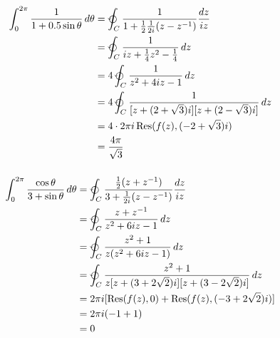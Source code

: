 \documentclass{article}
\newcommand{\Res}{\operatorname{Res}}
\begin{document}
\begin{align*}
  \int_0^{2 \pi} \frac{1}{1 + 0.5 \sin \theta} \,d \theta & = \varointctrclockwise_C \frac{1}{1 + \frac{1}{2} \frac{1}{2 i} (z - z^{-1})} \frac{d z}{i z} \\
                                                          & = \varointctrclockwise_C \frac{1}{i z + \frac{1}{4} z^2 - \frac{1}{4}} \,d z                  \\
                                                          & = 4 \varointctrclockwise_C \frac{1}{z^2 + 4 i z - 1} \,d z                                    \\
                                                          & = 4 \varointctrclockwise_C \frac{1}{[z + (2 + \sqrt{3}) i] [z + (2 - \sqrt{3}) i]} \,d z      \\
                                                          & = 4 \cdot 2 \pi i \Res(f(z), (-2 + \sqrt{3}) i)                                               \\
                                                          & = \frac{4 \pi}{\sqrt{3}}
\end{align*}

\setcounter{subsubsection}{2}
\subsubsection{}

\begin{align*}
  \int_0^{2 \pi} \frac{\cos \theta}{3 + \sin \theta} \,d \theta & = \varointctrclockwise_C \frac{\frac{1}{2} (z + z^{-1})}{3 + \frac{1}{2 i} (z - z^{-1})} \frac{d z}{i z} \\
                                                                & = \varointctrclockwise_C \frac{z + z^{-1}}{z^2 + 6 i z - 1} \,d z                                        \\
                                                                & = \varointctrclockwise_C \frac{z^2 + 1}{z (z^2 + 6 i z - 1)} \,d z                                       \\
                                                                & = \varointctrclockwise_C \frac{z^2 + 1}{z [z + (3 + 2 \sqrt{2}) i] [z + (3 - 2 \sqrt{2}) i]} \,d z       \\
                                                                & = 2 \pi i [\Res(f(z), 0) + \Res(f(z), (-3 + 2 \sqrt{2}) i)]                                              \\
                                                                & = 2 \pi i (-1 + 1)                                                                                       \\
                                                                & = 0
\end{align*}
\end{document}
